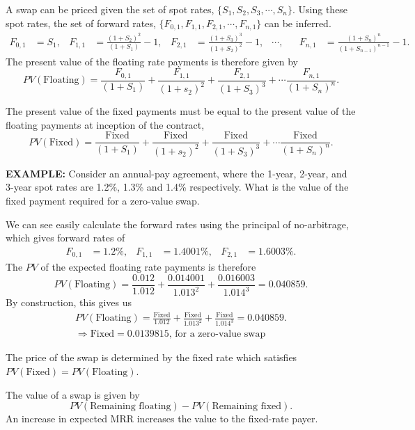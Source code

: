 \documentclass[../notes_compiled.tex]{subfiles}
\begin{document}
\begin{itemize}
\item A swap can be priced given the set of spot rates, $\{S_{1}, S_{2}, S_{3}, \cdots, S_{n}\}$. Using these spot rates, the set of forward rates, $\{F_{0,1}, F_{1,1}, F_{2,1}, \cdots, F_{n,1}\}$ can be inferred.
{\small
\begin{align*}
F_{0,1}&=S_{1}, & F_{1,1} &=\frac{(1+S_{2})^{2}}{(1+S_{1})} - 1, & F_{2,1} &= \frac{(1 + S_{3})^{3}}{(1 + S_{2})^{2}} -1,  & \cdots, & &F_{n,1} &= \frac{(1 + S_{n})^{n}}{(1 + S_{n-1})^{n-1}} -1.
\end{align*}
}
The present value of the floating rate payments is therefore given by
\begin{equation}
PV(\text{Floating}) = \frac{F_{0,1}}{(1 + S_{1})} + \frac{F_{1,1}}{(1 + s_{2})^{2}} + \frac{F_{2,1}}{(1 + S_{3})^{3}} + \cdots \frac{F_{n,1}}{(1 + S_{n})^{n}}.
\end{equation}

The present value of the fixed payments must be equal to the present value of the floating payments at inception of the contract,
\begin{equation}
PV(\text{Fixed}) = \frac{\text{Fixed}}{(1 + S_{1})} + \frac{\text{Fixed}}{(1 + s_{2})^{2}} + \frac{\text{Fixed}}{(1 + S_{3})^{3}} + \cdots \frac{\text{Fixed}}{(1 + S_{n})^{n}}.
\end{equation}
{\color{RedViolet}
\item[] \textbf{EXAMPLE:} Consider an annual-pay agreement, where the 1-year, 2-year, and 3-year spot rates are 1.2\%, 1.3\% and 1.4\% respectively. What is the value of the fixed payment required for a zero-value swap.
}
{\color{RoyalBlue}
\item[] We can see easily calculate the forward rates using the principal of no-arbitrage, which gives forward rates of
\begin{align*}
F_{0,1}&=1.2\%, & F_{1,1} &=1.4001\%, & F_{2,1} &= 1.6003\%.
\end{align*}
The $PV$ of the expected floating rate payments is therefore
\begin{equation*}
PV(\text{Floating}) = \frac{0.012}{1.012} + \frac{0.014001}{1.013^{2}} + \frac{0.016003}{1.014^{3}} = 0.040859.
\end{equation*}
By construction, this gives us
\begin{gather*}
PV(\text{Floating}) = \frac{\text{Fixed}}{1.012} + \frac{\text{Fixed}}{1.013^{2}} + \frac{\text{Fixed}}{1.014^{3}} = 0.040859. \\
\Rightarrow \text{Fixed} = 0.0139815\text{, for a zero-value swap}
\end{gather*}
}
\item The price of the swap is determined by the fixed rate which satisfies $PV(\text{Fixed}) = PV(\text{Floating})$.
\item The value of a swap is given by
\begin{equation}
PV(\text{Remaining floating}) - PV(\text{Remaining fixed}).
\end{equation}
An increase in expected MRR increases the value to the fixed-rate payer.
\end{itemize}
\end{document}
